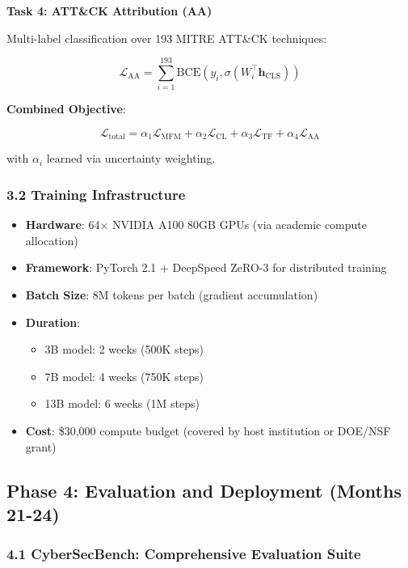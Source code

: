 \documentclass[11pt]{article}
\begin{document}
\textbf{Task 4: ATT\&CK Attribution (AA)}

Multi-label classification over 193 MITRE ATT\&CK techniques:

\begin{equation}
\mathcal{L}_{\text{AA}} = \sum_{i=1}^{193} \text{BCE}\left(y_i, \sigma(W_i^\top \mathbf{h}_{\text{CLS}})\right)
\end{equation}

\textbf{Combined Objective}:

\begin{equation}
\mathcal{L}_{\text{total}} = \alpha_1 \mathcal{L}_{\text{MFM}} + \alpha_2 \mathcal{L}_{\text{CL}} + \alpha_3 \mathcal{L}_{\text{TF}} + \alpha_4 \mathcal{L}_{\text{AA}}
\end{equation}

with $\alpha_i$ learned via uncertainty weighting.

\subsubsection{3.2 Training Infrastructure}

\begin{itemize}
    \item \textbf{Hardware}: 64$\times$ NVIDIA A100 80GB GPUs (via academic compute allocation)
    \item \textbf{Framework}: PyTorch 2.1 + DeepSpeed ZeRO-3 for distributed training
    \item \textbf{Batch Size}: 8M tokens per batch (gradient accumulation)
    \item \textbf{Duration}:
    \begin{itemize}
        \item 3B model: 2 weeks (500K steps)
        \item 7B model: 4 weeks (750K steps)
        \item 13B model: 6 weeks (1M steps)
    \end{itemize}
    \item \textbf{Cost}: \$30,000 compute budget (covered by host institution or DOE/NSF grant)
\end{itemize}

\subsection{Phase 4: Evaluation and Deployment (Months 21-24)}

\subsubsection{4.1 CyberSecBench: Comprehensive Evaluation Suite}
\end{document}
